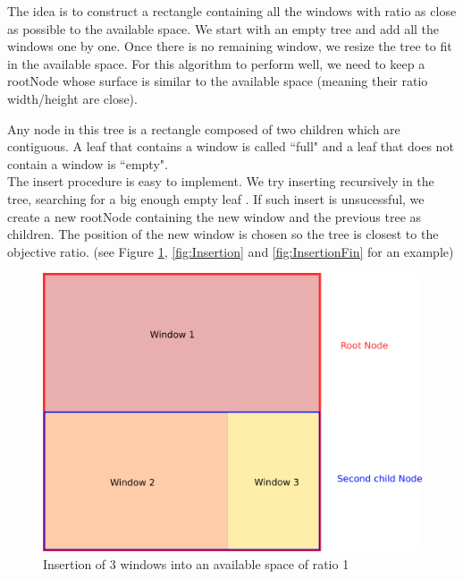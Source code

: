 \documentclass{acmtog}
\begin{document}
The idea is to construct a rectangle containing all the windows with ratio as close as possible to the available space. We start with an empty tree and add all the windows one by one. Once there is no remaining window, we resize the tree to fit in the available space. For this algorithm to perform well, we need to keep a rootNode whose surface is similar to the available space (meaning their ratio width/height are close). 

Any node in this tree is a rectangle composed of two children which are contiguous. A leaf that contains a window is called ``full" and a leaf that does not contain a window is ``empty".  \\

The insert procedure is easy to implement. We try inserting recursively in the tree, searching for a big enough empty leaf . If such insert is unsucessful, we create a new rootNode containing the new window and the previous tree as children. The position of the new window is chosen so the tree is closest to the objective ratio. (see Figure \ref{fig:SimpleInsert}, \ref{fig:Insertion} and \ref{fig:InsertionFin} for an example)

\begin{figure}
  \includegraphics[width=\linewidth]{Images/1erDessin.png}
  \caption{Insertion of 3 windows into an available space of ratio 1}
  \label{fig:SimpleInsert}
\end{figure}
\end{document}
